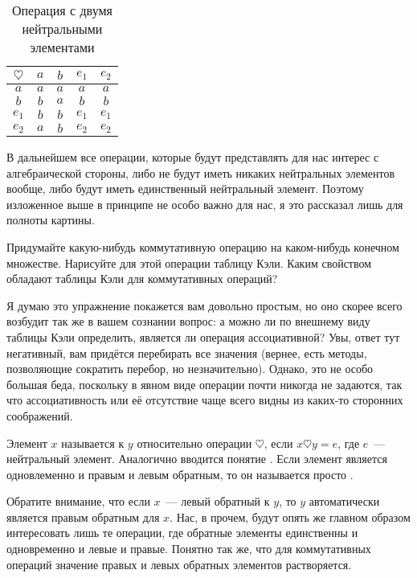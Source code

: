 \begin{table}[h]\label{tb:alg_2neutr}
\centering
\begin{tabular}{c|cccc}
$\heartsuit$ & $a$ & $b$ & $e_1$ & $e_2$ \\
\hline
$a$ & $a$ & $a$ & $a$ & $a$ \\
$b$ & $b$ & $a$ & $b$ & $b$ \\
$e_1$ & $b$ & $b$ & $e_1$ & $e_1$ \\
$e_2$ & $a$ & $b$ & $e_2$ & $e_2$
\end{tabular}
\caption{Операция с двумя нейтральными элементами}
\end{table}

В дальнейшем все операции, которые будут представлять для нас интерес с алгебраической стороны, либо не будут иметь никаких нейтральных элементов вообще, либо будут иметь единственный нейтральный элемент. Поэтому изложенное выше в принципе не особо важно для нас, я это рассказал лишь для полноты картины.

\begin{exercise}
Придумайте какую-нибудь коммутативную операцию на каком-нибудь конечном множестве. Нарисуйте для этой операции таблицу Кэли. Каким свойством обладают таблицы Кэли для коммутативных операций?
\end{exercise}

Я думаю это упражнение покажется вам довольно простым, но оно скорее всего возбудит так же в вашем сознании вопрос: а можно ли по внешнему виду таблицы Кэли определить, является ли операция ассоциативной? Увы, ответ тут негативный, вам придётся перебирать все значения (вернее, есть методы, позволяющие сократить перебор, но незначительно). Однако, это не особо большая беда, поскольку в явном виде операции почти никогда не задаются, так что ассоциативность или её отсутствие чаще всего видны из каких-то сторонних соображений.

\begin{definition}
Элемент $x$ называется  к $y$ относительно операции $\heartsuit$, если
$x\heartsuit y = e$, 
где $e$~--- нейтральный элемент. Аналогично вводится понятие . Если элемент является одновлеменно и правым и левым обратным, то он называется просто .
\end{definition}

Обратите внимание, что если $x$~--- левый обратный к $y$, то $y$ автоматически является правым обратным для $x$. Нас, в прочем, будут опять же главном образом интересовать лишь те операции, где обратные элементы единственны и одновременно и левые и правые. Понятно так же, что для коммутативных операций значение правых и левых обратных элементов растворяется.

